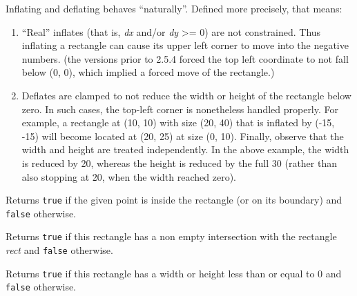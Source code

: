 Inflating and deflating behaves ``naturally''. Defined more precisely, that
means:
\begin{enumerate}
    \item ``Real'' inflates (that is, {\it dx} and/or {\it dy} >= 0) are not
        constrained. Thus inflating a rectangle can cause its upper left corner
        to move into the negative numbers. (the versions prior to 2.5.4 forced
        the top left coordinate to not fall below (0, 0), which implied a
        forced move of the rectangle.)

    \item Deflates are clamped to not reduce the width or height of the
        rectangle below zero. In such cases, the top-left corner is nonetheless
        handled properly. For example, a rectangle at (10, 10) with size (20,
        40) that is inflated by (-15, -15) will become located at (20, 25) at
        size (0, 10). Finally, observe that the width and height are treated
        independently. In the above example, the width is reduced by 20,
        whereas the height is reduced by the full 30 (rather than also stopping
        at 20, when the width reached zero).
\end{enumerate}




\label{wxrectinside}



Returns {\tt true} if the given point is inside the rectangle (or on its
boundary) and {\tt false} otherwise.


\label{wxrectintersects}


Returns {\tt true} if this rectangle has a non empty intersection with the
rectangle {\it rect} and {\tt false} otherwise.


\label{wxrectisempty}


Returns {\tt true} if this rectangle has a width or height less than or equal to 
0 and {\tt false} otherwise.


\label{wxrectoffset}

